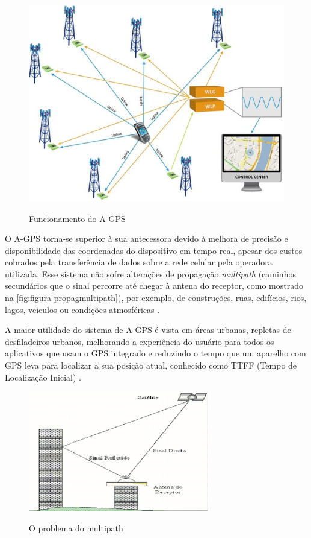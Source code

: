 \begin{figure}[H]
    \centering
    \caption{Funcionamento do A-GPS}
    \includegraphics[width=1.0\textwidth]{./dados/figuras/fig2}
    \label{fig:figura-funcagps}
\end{figure}

O A-GPS torna-se superior à sua antecessora devido à melhora de precisão e disponibilidade das coordenadas do dispositivo em tempo real, apesar dos custos cobrados pela transferência de dados sobre a rede celular pela operadora utilizada. Esse sistema não sofre alterações de propagação \textit{multipath} (caminhos secundários que o sinal percorre até chegar à antena do receptor, como mostrado na \autoref{fig:figura-propagmultipath}), por exemplo, de construções, ruas, edifícios, rios, lagos, veículos ou condições atmosféricas \cite{oficinanetagps:2018} \cite{multicaminho:2004}.

 A maior utilidade do sistema de A-GPS é vista em áreas urbanas, repletas de desfiladeiros urbanos, melhorando a experiência do usuário para todos os aplicativos que usam o GPS integrado e reduzindo o tempo que um aparelho com GPS leva para localizar a sua posição atual, conhecido como TTFF (Tempo de Localização Inicial) \cite{oficinanetagps:2018}.

\begin{figure}[H]
    \centering
    \caption{O problema do multipath}
    \includegraphics[width=0.7\textwidth]{./dados/figuras/fig3}
    \label{fig:figura-propagmultipath}
\end{figure}

